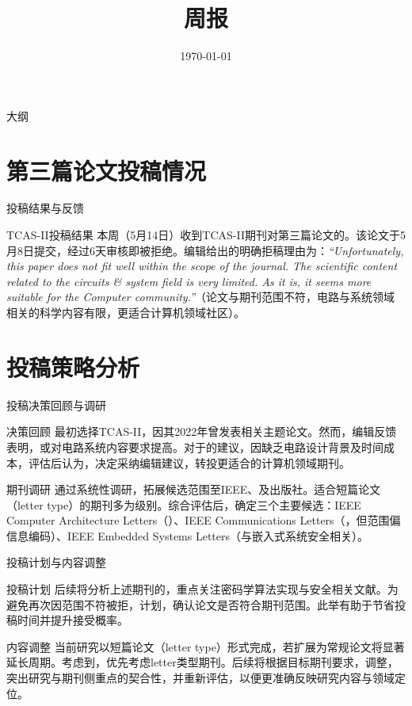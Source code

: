 \documentclass{beamer}
\title{\LARGE{周报}}
\subtitle{}
\author{}
\date{\today}
\begin{document}
\begin{frame}
  \titlepage
\end{frame}

\begin{frame}{大纲}
  \tableofcontents
\end{frame}


\section{第三篇论文投稿情况}
\begin{frame}{投稿结果与反馈}
  \begin{block}{TCAS-II投稿结果}
    本周（5月14日）收到TCAS-II期刊对第三篇论文的。该论文于5月8日提交，经过6天审核即被拒绝。编辑给出的明确拒稿理由为：\textit{“Unfortunately, this paper does not fit well within the scope of the journal. The scientific content related to the circuits \& system field is very limited. As it is, it seems more suitable for the Computer community.”}（论文与期刊范围不符，电路与系统领域相关的科学内容有限，更适合计算机领域社区）。
  \end{block}
\end{frame}

\section{投稿策略分析}
\begin{frame}{投稿决策回顾与调研}
  \begin{block}{决策回顾}
    最初选择TCAS-II，因其2022年曾发表相关主题论文。然而，编辑反馈表明，或对电路系统内容要求提高。对于的建议，因缺乏电路设计背景及时间成本，评估后认为，决定采纳编辑建议，转投更适合的计算机领域期刊。
  \end{block}
  \begin{block}{期刊调研}
    通过系统性调研，拓展候选范围至IEEE、及出版社。适合短篇论文（letter type）的期刊多为级别。综合评估后，确定三个主要候选：IEEE Computer Architecture Letters（）、IEEE Communications Letters（，但范围偏信息编码）、IEEE Embedded Systems Letters（与嵌入式系统安全相关）。
  \end{block}
\end{frame}

\begin{frame}{投稿计划与内容调整}
  \begin{block}{投稿计划}
    后续将分析上述期刊的，重点关注密码学算法实现与安全相关文献。为避免再次因范围不符被拒，计划，确认论文是否符合期刊范围。此举有助于节省投稿时间并提升接受概率。
  \end{block}
  \begin{block}{内容调整}
    当前研究以短篇论文（letter type）形式完成，若扩展为常规论文将显著延长周期。考虑到，优先考虑letter类型期刊。后续将根据目标期刊要求，调整，突出研究与期刊侧重点的契合性，并重新评估，以便更准确反映研究内容与领域定位。
  \end{block}
\end{frame}
\end{document}
